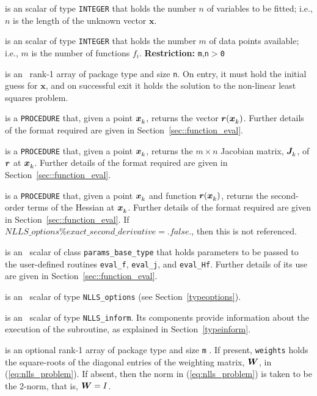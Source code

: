 \documentclass{spec}
\newcommand{\scalarintegerii}{is an \intentin scalar of type {\tt INTEGER} }
\newcommand{\ronearrayrealiiopt}[1]{is an optional \intentin rank-1 array of package type and size {\tt #1} }
\begin{document}
\begin{description}
 \scalarintegerii that holds the number $n$ of
variables to be fitted; i.e., $n$ is the length of the unknown vector $\bm x$.

 \scalarintegerii that holds the number $m$ of
data points available; i.e., $m$ is the number of functions $f_i$.
\textbf{Restriction:} \texttt{m},\texttt{n}$>$\texttt{0}

 is an \intentinout\  rank-1 array of package type
and size {\tt n}.  On entry, it must hold the initial guess for $\bm x$, and on
successful exit it holds the solution to the non-linear least squares problem.

 is a {\tt PROCEDURE} that, given a point ${\bm x}_{k}^{}$, returns the vector ${\bm r}({\bm x}_{k}^{})$.
Further details of the format required are given in Section~\ref{sec::function_eval}.

 is a {\tt PROCEDURE} that, given a point ${\bm x}_{k}^{}$,
returns the $m \times n$ Jacobian matrix, ${\bm J}_{k}^{}$, of ${\bm r}$ at ${\bm x}_{k}^{}$.
Further details of the format required are given in Section~\ref{sec::function_eval}.

 is a {\tt PROCEDURE} that, given a point ${\bm x}_{k}^{}$
and function ${\bm r}({\bm x}_{k}^{})$, returns the second-order terms of the Hessian at ${\bm x}_{k}^{}$.
Further details of the format required are given in Section~\ref{sec::function_eval}.  If $NLLS\_options\%exact\_second\_derivative = .false.$, then this is not referenced.

 is an \intentin\ scalar of class {\tt params\_base\_type} that holds parameters to
be passed to the user-defined routines {\tt eval\_f}, {\tt eval\_j}, and {\tt eval\_Hf}.
Further details of its use are given in Section~\ref{sec::function_eval}.

is an \intentin\  scalar  of type {\tt NLLS\_options}
(see Section~\ref{typeoptions}).

 is an \intentinout\ scalar of type
{\tt NLLS\_inform}. Its components provide information about the execution
of the subroutine, as explained in Section~\ref{typeinform}.

 \ronearrayrealiiopt{m}.  If present, {\tt weights} holds the square-roots of the 
diagonal entries of the weighting matrix, ${\bm W}$, in (\ref{eq:nlls_problem}).  If absent, then the norm in (\ref{eq:nlls_problem}) is taken to be the 2-norm, that is, ${\bm W} = I$.

\end{description}
\end{document}
